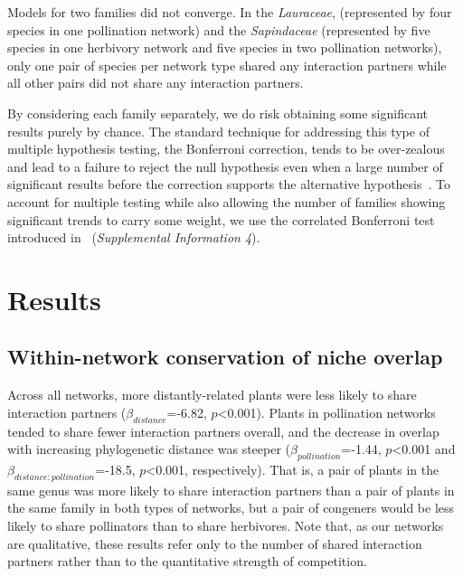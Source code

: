 \documentclass[12pt]{article}
\begin{document}
\begin{spacing}{1.5}
    Models for two families did not converge. In the \emph{Lauraceae}, (represented by four species in one pollination network) and the \emph{Sapindaceae} (represented by five species in one herbivory network and five species in two pollination networks), only one pair of species per network type shared any interaction partners while all other pairs did not share any interaction partners. 


    By considering each family separately, we do risk obtaining some significant results purely by chance. The standard technique for addressing this type of multiple hypothesis testing, the Bonferroni correction, tends to be over-zealous and lead to a failure to reject the null hypothesis even when a large number of significant results before the correction supports the alternative hypothesis~\citep{Moran2003}. To account for multiple testing while also allowing the number of families showing significant trends to carry some weight, we use the correlated Bonferroni test introduced in~\citet{Drezner2016} (\emph{Supplemental Information 4}).


\clearpage

\section*{Results}


  \subsection*{Within-network conservation of niche overlap} 

    Across all networks, more distantly-related plants were less likely to 
    share interaction partners ($\beta_{distance}$=-6.82, 
    $p$\textless0.001). Plants in pollination networks tended to share 
    fewer interaction partners overall, and the decrease in overlap with 
    increasing phylogenetic distance was steeper 
    ($\beta_{pollination}$=-1.44, $p$\textless0.001 and 
    $\beta_{distance:pollination}$=-18.5, $p$\textless0.001, respectively). 
    That is, a pair of plants in the same genus was more likely to share 
    interaction partners than a pair of plants in the same family in both 
    types of networks, but a pair of congeners would be less likely to 
    share pollinators than to share herbivores. Note that, as our networks 
    are qualitative, these results refer only to the number of shared interaction
    partners rather than to the quantitative strength of competition.



\end{spacing}
\end{document}
